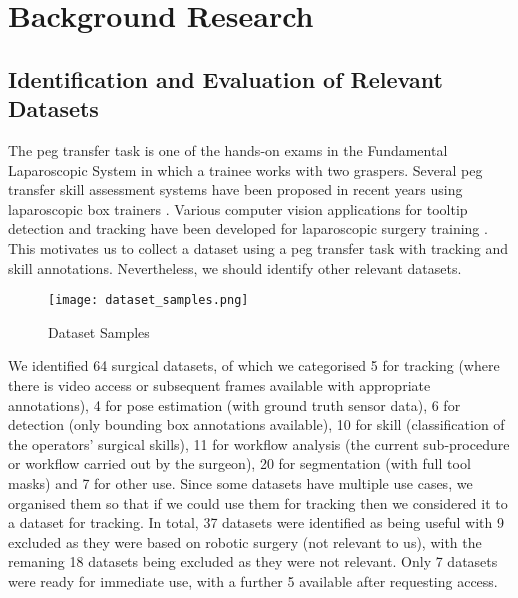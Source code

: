 \section{Background Research}

\subsection{Identification and Evaluation of Relevant Datasets}

The peg transfer task is one of the hands-on exams in the Fundamental Laparoscopic System \cite{maciel_development_2008, matsumoto_laparoscopic_2022, Rashidi_Fathabadi_Grantner_Shebrain_Abdel} in which a trainee works with two graspers. Several peg transfer skill assessment systems have been proposed in recent years using laparoscopic box trainers \cite{Rashidi_Fathabadi_Grantner_Shebrain_Abdel}. Various computer vision applications for tooltip detection and tracking have been developed for laparoscopic surgery training \cite{matsumoto_laparoscopic_2022}. This motivates us to collect a dataset using a peg transfer task with tracking and skill annotations. Nevertheless, we should identify other relevant datasets.

\begin{figure}[htbp]
    \centering
    \vspace*{-2mm}
    \texttt{[image: dataset\_samples.png]}
    \vspace*{-8mm}
    \caption{Dataset Samples}
    \vspace*{-4mm}
    \label{fig:schematic_diagram}
\end{figure}


We identified 64 surgical datasets, of which we categorised 5 for tracking (where there is video access or subsequent frames available with appropriate annotations), 4 for pose estimation (with ground truth sensor data), 6 for detection (only bounding box annotations available), 10 for skill (classification of the operators' surgical skills), 11 for workflow analysis (the current sub-procedure or workflow carried out by the surgeon), 20 for segmentation (with full tool masks) and 7 for other use. Since some datasets have multiple use cases, we organised them so that if we could use them for tracking then we considered it to a dataset for tracking. In total, 37 datasets were identified as being useful with 9 excluded as they were based on robotic surgery (not relevant to us), with the remaning 18 datasets being excluded as they were not relevant. Only 7 datasets were ready for immediate use, with a further 5 available after requesting access.

